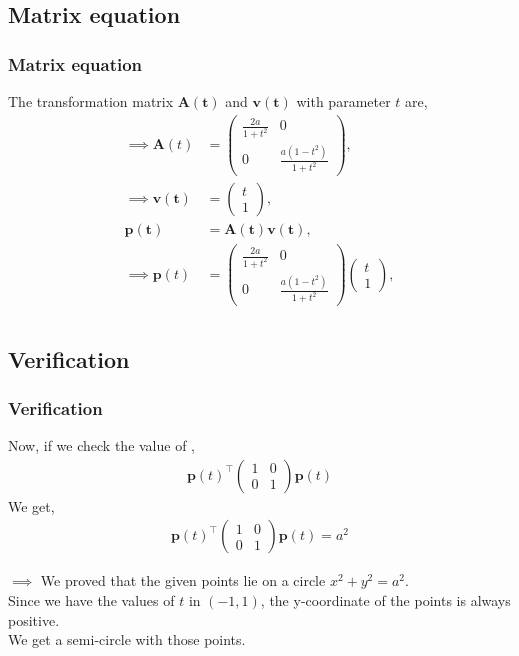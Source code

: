 \documentclass{beamer}
\theoremstyle{remark}
\newcommand{\myvec}[1]{\ensuremath{\begin{pmatrix}#1\end{pmatrix}}}
\let\vec\mathbf
\numberwithin{equation}{section}
\begin{document}
\subsection{Matrix equation}
\begin{frame}
\frametitle{Matrix equation}
	The transformation matrix $\vec{A(t)}$ and $\vec{v(t)}$ with parameter $t$ are,\\
	\begin{align}
		\implies \mathbf{A}(t) & = \myvec{ \frac{2a}{1+t^2} & 0 \\ 0 & \frac{a(1-t^2)}{1+t^2}},\\ \implies \mathbf{v(t)} &= \myvec{t \\ 1},\\ \mathbf{p(t)} &= \mathbf{A(t)} \mathbf{v(t)}, \\\implies  \mathbf{p}(t) & = \myvec{ \frac{2a}{1+t^2} & 0 \\ 0 & \frac{a(1 - t^2)}{1+t^2} } \myvec{t \\ 1},\\ 
	\end{align}
\end{frame}
\subsection{Verification}
\begin{frame}[fragile]
\frametitle{Verification}
Now, if we check the value of ,
    \begin{align}
    \mathbf{p}(t)^\top \myvec{ 1 & 0 \\ 0 & 1 } \mathbf{p}(t)
    \end{align}
	We get,\\
  \begin{align}
    \mathbf{p}(t)^\top \myvec{ 1 & 0 \\ 0 & 1 } \mathbf{p}(t)=a^2
    \end{align}

	$\implies$ We proved that the given points lie on a circle $x^2 + y^2 = a^2$.\\
	Since we have the values of $t$ in $(-1,1)$, the y-coordinate of the points is always positive.\\
	We get a semi-circle with those points.
\end{frame}
\end{document}
